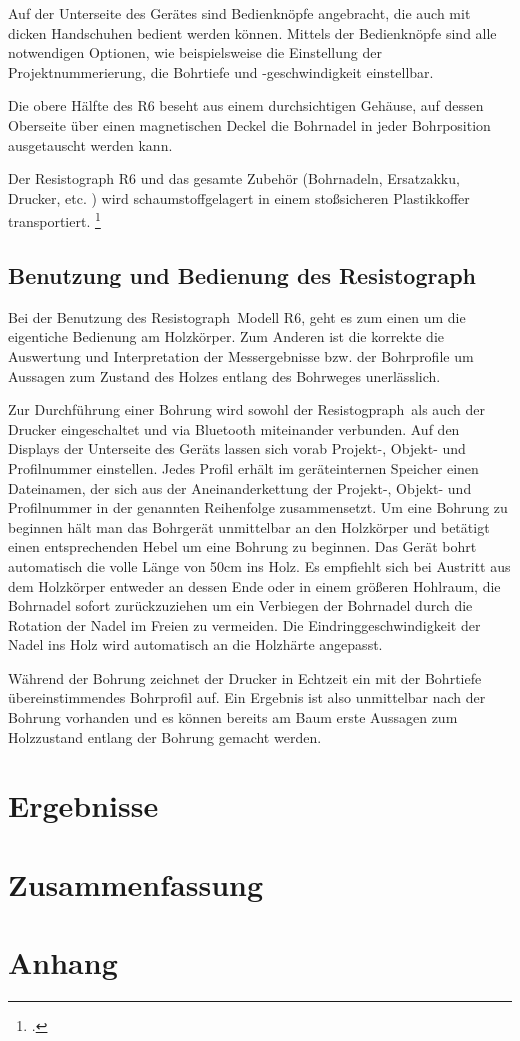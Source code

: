 \documentclass[a4paper, halfparskip]{article}
\def\SymbReg{\textsuperscript{\textregistered}}
\begin{document}
Auf der Unterseite des Gerätes sind Bedienknöpfe angebracht, die auch mit
dicken Handschuhen bedient werden können. Mittels der Bedienknöpfe sind alle
notwendigen Optionen, wie beispielsweise die Einstellung der
Projektnummerierung, die Bohrtiefe und -geschwindigkeit einstellbar.

Die obere Hälfte des R6 beseht aus einem durchsichtigen Gehäuse, auf dessen
Oberseite über einen magnetischen Deckel die Bohrnadel in jeder
Bohrposition ausgetauscht werden kann.

Der Resistograph R6 und das gesamte Zubehör (Bohrnadeln, Ersatzakku, Drucker,
etc. ) wird schaumstoffgelagert in einem stoßsicheren Plastikkoffer
transportiert. \footcite{rinn:anleitung_resi}

\subsection{Benutzung und Bedienung des Resistograph\SymbReg}
Bei der Benutzung des Resistograph\SymbReg\ Modell R6, geht es zum einen um
die eigentiche Bedienung am Holzkörper. Zum Anderen ist die korrekte die
Auswertung und Interpretation der Messergebnisse bzw. der Bohrprofile um
Aussagen zum Zustand des Holzes entlang des Bohrweges unerlässlich.

Zur Durchführung einer Bohrung wird sowohl der Resistogpraph\SymbReg\ als auch
der Drucker eingeschaltet und via Bluetooth miteinander verbunden. Auf den
Displays der Unterseite des Geräts lassen sich vorab Projekt-, Objekt- und
Profilnummer einstellen. Jedes Profil erhält im geräteinternen Speicher einen
Dateinamen, der sich aus der Aneinanderkettung der Projekt-, Objekt- und
Profilnummer in der genannten Reihenfolge zusammensetzt. Um eine Bohrung zu
beginnen hält man das Bohrgerät unmittelbar an den Holzkörper und betätigt
einen entsprechenden Hebel um eine Bohrung zu beginnen. Das Gerät bohrt
automatisch die volle Länge von 50cm ins Holz. Es empfiehlt sich bei Austritt
aus dem Holzkörper entweder an dessen Ende oder in einem größeren Hohlraum,
die Bohrnadel sofort zurückzuziehen um ein Verbiegen der Bohrnadel durch die
Rotation der Nadel im Freien zu vermeiden.  Die Eindringgeschwindigkeit der
Nadel ins Holz wird automatisch an die Holzhärte angepasst.

Während der Bohrung zeichnet der Drucker in Echtzeit ein mit der Bohrtiefe
übereinstimmendes Bohrprofil auf. Ein Ergebnis ist also unmittelbar nach der
Bohrung vorhanden und es können bereits am Baum erste Aussagen zum Holzzustand
entlang der Bohrung gemacht werden.

\section{Ergebnisse}
\section{Zusammenfassung}
\section{Anhang}



\end{document}
